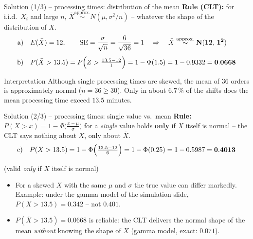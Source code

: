 \documentclass[aspectratio=169,11pt]{beamer}
\begin{document}
\begin{frame}{Solution (1/3) -- processing times: distribution of the mean}
  \textbf{Rule (CLT):} for i.i.d.\ $X_i$ and large $n$,
  $\bar X\overset{\text{approx.}}{\sim}N(\mu,\sigma^2/n)$ -- whatever the
  shape of the distribution of $X$.
  \begin{align*}
    \text{a)}\quad & E(\bar X)=12,\qquad
      \mathrm{SE}=\frac{\sigma}{\sqrt n}=\frac{6}{\sqrt{36}}=1
      \quad\Rightarrow\quad \bar X\overset{\text{approx.}}{\sim}\mathbf{N(12,\,1^2)}\\[4pt]
    \text{b)}\quad & P(\bar X>13.5)=P\Bigl(Z>\tfrac{13.5-12}{1}\Bigr)
      =1-\Phi(1.5)=1-0.9332=\mathbf{0.0668}
  \end{align*}
  \begin{exampleblock}{Interpretation}
    Although single processing times are skewed, the mean of $36$ orders is
    approximately normal ($n=36\ge30$). Only in about $6.7\,\%$ of the shifts
    does the mean processing time exceed $13.5$ minutes.
  \end{exampleblock}
\end{frame}

\begin{frame}{Solution (2/3) -- processing times: single value vs.\ mean}
  \textbf{Rule:} $P(X>x)=1-\Phi\bigl(\tfrac{x-\mu}{\sigma}\bigr)$ for a
  \emph{single} value holds \textbf{only} if $X$ itself is normal -- the CLT
  says nothing about $X$, only about $\bar X$.
  \[
    \text{c)}\quad P(X>13.5)=1-\Phi\Bigl(\tfrac{13.5-12}{6}\Bigr)
      =1-\Phi(0.25)=1-0.5987=\mathbf{0.4013}
  \]
  \vspace{-6pt}
  \centerline{\small (valid \emph{only} if $X$ itself is normal)}
  \begin{itemize}\small\setlength{\itemsep}{2pt}
    \item For a skewed $X$ with the same $\mu$ and $\sigma$ the true value can
          differ markedly. Example: under the gamma model of the simulation
          slide, $P(X>13.5)=0.342$ -- not $0.401$.
    \item $P(\bar X>13.5)=0.0668$ is reliable: the CLT delivers the normal
          shape of the mean \emph{without} knowing the shape of $X$ (gamma
          model, exact: $0.071$).
  \end{itemize}
\end{frame}
\end{document}
